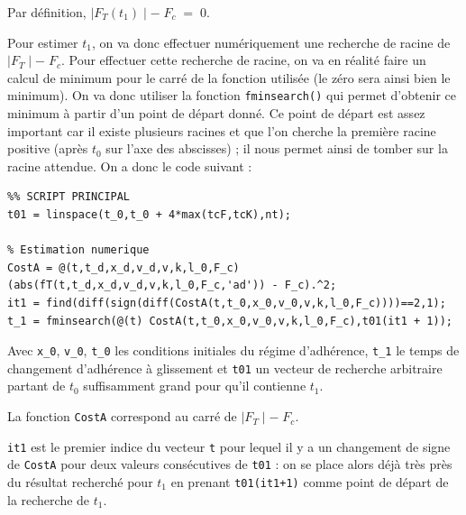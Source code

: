 \documentclass{article}
\newcommand{\ts}{\scriptscriptstyle}
\begin{document}
%
Par définition, $\mid F_{\ts T}(t_1)\mid -\; F_c \; = \; 0$.  

Pour estimer $t_1$, on va donc effectuer numériquement une recherche de racine de $\mid F_{\ts T}\mid -\; F_c$. Pour effectuer cette recherche de racine, on va en réalité faire un calcul de minimum pour le carré de la fonction utilisée (le zéro sera ainsi bien le minimum). On va donc utiliser la fonction \verb|fminsearch()| qui permet d'obtenir ce minimum à partir d'un point de départ donné. Ce point de départ est assez important car il existe plusieurs racines et que l'on cherche la première racine positive (après $t_0$ sur l'axe des abscisses) ; il nous permet ainsi de tomber sur la racine attendue. On a donc le code suivant :
 
\begin{lstlisting}
%% SCRIPT PRINCIPAL
t01 = linspace(t_0,t_0 + 4*max(tcF,tcK),nt);

% Estimation numerique
CostA = @(t,t_d,x_d,v_d,v,k,l_0,F_c) (abs(fT(t,t_d,x_d,v_d,v,k,l_0,F_c,'ad')) - F_c).^2;
it1 = find(diff(sign(diff(CostA(t,t_0,x_0,v_0,v,k,l_0,F_c))))==2,1);
t_1 = fminsearch(@(t) CostA(t,t_0,x_0,v_0,v,k,l_0,F_c),t01(it1 + 1));
\end{lstlisting}
Avec \verb|x_0|, \verb|v_0|, \verb|t_0| les conditions initiales du régime d'adhérence, \verb|t_1| le temps de changement d'adhérence à glissement et \verb|t01| un vecteur de recherche arbitraire partant de $t_0$ suffisamment grand pour qu'il contienne $t_1$.

La fonction \verb|CostA| correspond au carré de $\mid F_{\ts T}\mid -\; F_c$.

\verb|it1| est le premier indice du vecteur \verb|t| pour lequel il y a un changement de signe de \verb|CostA| pour deux valeurs consécutives de \verb|t01| : on se place alors déjà très près du résultat recherché pour $t_1$ en prenant \verb|t01(it1+1)| comme point de départ de la recherche de $t_1$.   
\end{document}
